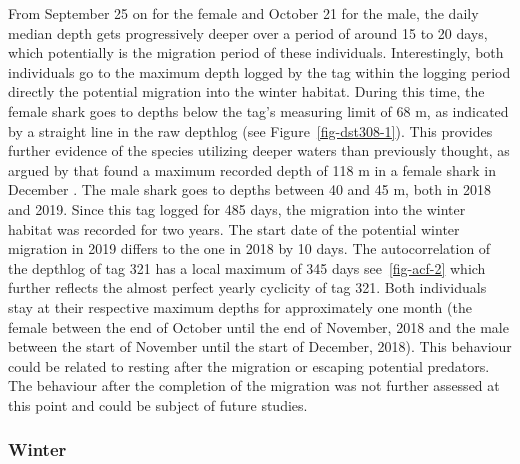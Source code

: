 \documentclass[
  authoryear,
  review,
  3p]{elsarticle}
\begin{document}
From September 25 on for the female and October 21 for the male, the
daily median depth gets progressively deeper over a period of around 15
to 20 days, which potentially is the migration period of these
individuals. Interestingly, both individuals go to the maximum depth
logged by the tag within the logging period directly the potential
migration into the winter habitat. During this time, the female shark
goes to depths below the tag's measuring limit of 68 m, as indicated by
a straight line in the raw depthlog (see Figure~\ref{fig-dst308-1}).
This provides further evidence of the species utilizing deeper waters
than previously thought, as argued by \citet{griffiths_2020} that found
a maximum recorded depth of 118 m in a female shark in December
\citep[S4]{griffiths_2020}. The male shark goes to depths between 40 and
45 m, both in 2018 and 2019. Since this tag logged for 485 days, the
migration into the winter habitat was recorded for two years. The start
date of the potential winter migration in 2019 differs to the one in
2018 by 10 days. The autocorrelation of the depthlog of tag 321 has a
local maximum of 345 days see~\ref{fig-acf-2} which further reflects the
almost perfect yearly cyclicity of tag 321. Both individuals stay at
their respective maximum depths for approximately one month (the female
between the end of October until the end of November, 2018 and the male
between the start of November until the start of December, 2018). This
behaviour could be related to resting after the migration or escaping
potential predators. The behaviour after the completion of the migration
was not further assessed at this point and could be subject of future
studies.

\hypertarget{winter}{%
\subsubsection{Winter}\label{winter}}
\end{document}
